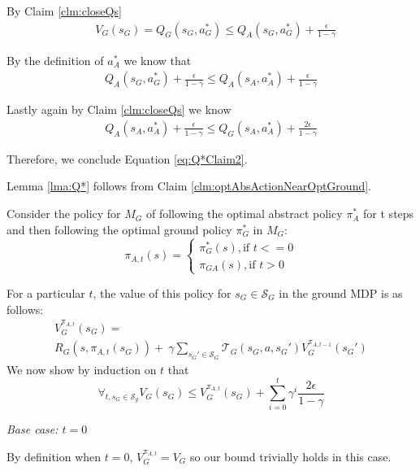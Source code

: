 By Claim \ref{clm:closeQs}
\begin{align}
&V_G(s_G) = Q_G(s_G, a^*_G) \leq Q_A(s_G, a^*_G) + \frac{\epsilon}{1-\gamma}
\label{eq:Q*OptActionResult}
\end{align}

 By the definition of $a^*_A$ we know that 
 \begin{align}
Q_A(s_G, a^*_G) + \frac{\epsilon}{1-\gamma} \leq Q_A(s_A, a^*_A) + \frac{\epsilon}{1-\gamma}
\end{align}

Lastly again by Claim \ref{clm:closeQs} we know
\begin{align}
Q_A(s_A, a^*_A) + \frac{\epsilon}{1-\gamma} \leq Q_G(s_A, a^*_A) + \frac{2\epsilon}{1-\gamma}
\end{align}

Therefore, we conclude Equation \ref{eq:Q*Claim2}.

\begin{clm}
Lemma \ref{lma:Q*} follows from Claim \ref{clm:optAbsActionNearOptGround}.
\end{clm}

Consider the policy for $M_G$ of following the optimal abstract policy $\pi^*_A$ for t steps and then following the optimal ground policy $\pi^*_G$ in $M_G$:
\begin{equation}
\pi_{A,t}(s)=
\begin{cases}
\pi_G^*(s), \text{if $t<=0$}\\
\pi_{GA}(s), \text{if $t > 0$}
\end{cases}
\end{equation}

For a particular $t$, the value of this policy for $s_G \in \mathcal{S}_G$ in the ground \ac{MDP} is as follows:
\begin{multline*}
V_G^{\pi_{A,t}}(s_G) = \\
R_G(s, \pi_{A,t}(s_G)) +\ \gamma \sum_{{s_G}' \in \mathcal{S}_G}\mathcal{T}_G(s_G, a, {s_G}')V_G^{\pi_{A,t-1}}({s_G}')
\end{multline*}
We now show by induction on $t$ that
\begin{equation}
\forall_{t, s_G \in \mathcal{S}_g} V_G(s_G) \leq  V_G^{\pi_{A,t}}(s_G) + \sum_{i=0}^{t}\gamma^i \frac{2\epsilon}{1-\gamma}
\end{equation}

\textit{Base case: $t=0$}

By definition when $t=0$, $V_G^{\pi_{A,t}} = V_G$ so our bound trivially holds in this case.

